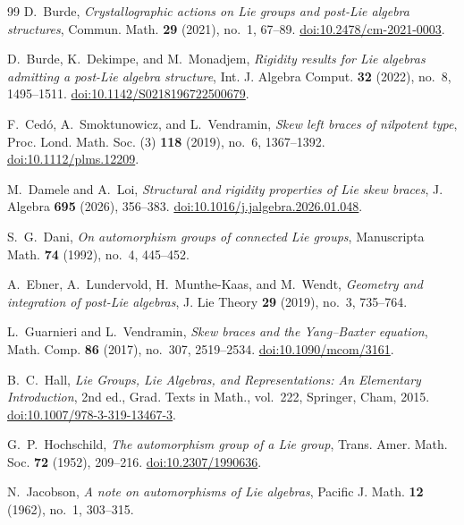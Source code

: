 \documentclass[reqno]{amsart}
\begin{document}
\begin{thebibliography}{99}
D.~Burde,
\emph{Crystallographic actions on Lie groups and post-Lie algebra structures},
Commun. Math. \textbf{29} (2021), no.~1, 67--89.
\href{https://doi.org/10.2478/cm-2021-0003}{doi:10.2478/cm-2021-0003}.

D.~Burde, K.~Dekimpe, and M.~Monadjem,
\emph{Rigidity results for Lie algebras admitting a post-Lie algebra structure},
Int. J. Algebra Comput. \textbf{32} (2022), no.~8, 1495--1511.
\href{https://doi.org/10.1142/S0218196722500679}{doi:10.1142/S0218196722500679}.

F.~Ced\'o, A.~Smoktunowicz, and L.~Vendramin,
\emph{Skew left braces of nilpotent type},
Proc. Lond. Math. Soc. (3) \textbf{118} (2019), no.~6, 1367--1392.
\href{https://doi.org/10.1112/plms.12209}{doi:10.1112/plms.12209}.

M.~Damele and A.~Loi,
\emph{Structural and rigidity properties of Lie skew braces},
J. Algebra \textbf{695} (2026), 356--383.
\href{https://doi.org/10.1016/j.jalgebra.2026.01.048}{doi:10.1016/j.jalgebra.2026.01.048}.



S.~G.~Dani,
\emph{On automorphism groups of connected Lie groups},
Manuscripta Math. \textbf{74} (1992), no.~4, 445--452.



A.~Ebner, A.~Lundervold, H.~Munthe-Kaas, and M.~Wendt,
\emph{Geometry and integration of post-Lie algebras},
J. Lie Theory \textbf{29} (2019), no.~3, 735--764.

L.~Guarnieri and L.~Vendramin,
\emph{Skew braces and the Yang--Baxter equation},
Math. Comp. \textbf{86} (2017), no.~307, 2519--2534.
\href{https://doi.org/10.1090/mcom/3161}{doi:10.1090/mcom/3161}.

B.~C.~Hall,
\emph{Lie Groups, Lie Algebras, and Representations: An Elementary Introduction},
2nd ed., Grad. Texts in Math., vol.~222, Springer, Cham, 2015.
\href{https://doi.org/10.1007/978-3-319-13467-3}{doi:10.1007/978-3-319-13467-3}.



G.~P.~Hochschild,
\emph{The automorphism group of a Lie group},
Trans. Amer. Math. Soc. \textbf{72} (1952), 209--216.
\href{https://doi.org/10.2307/1990636}{doi:10.2307/1990636}.

N.~Jacobson,
\emph{A note on automorphisms of Lie algebras},
Pacific J. Math. \textbf{12} (1962), no.~1, 303--315.



\end{thebibliography}
\end{document}
